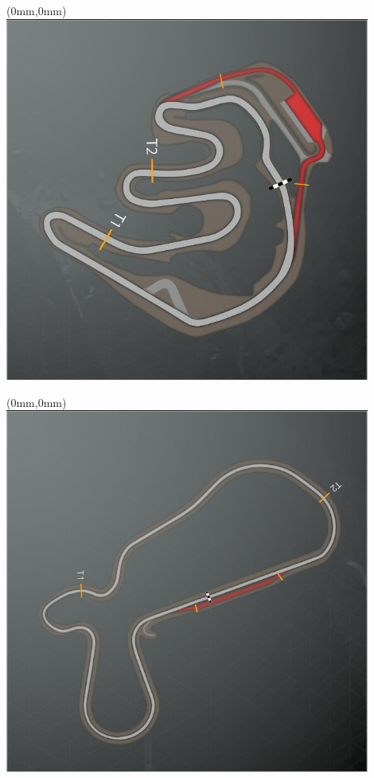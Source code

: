 \null\newpage
\begin{textblock*}{30mm}(0mm,0mm)%
\includegraphics[width=120mm]{TR/2015-05-20_00069.png}
\end{textblock*}
\null\newpage
\begin{textblock*}{30mm}(0mm,0mm)%
\includegraphics[width=120mm]{TR/2015-05-20_00068.png}
\end{textblock*}
